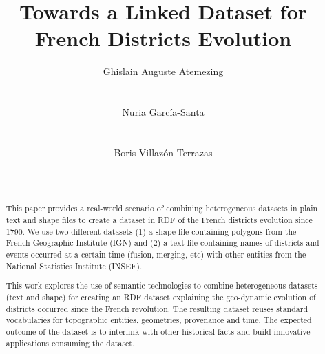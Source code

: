 \documentclass{sig-alternate}
\begin{document}


\title{Towards a Linked Dataset for French Districts Evolution}

\author{
\alignauthor Ghislain Auguste Atemezing\\
       \\
       \\
  \alignauthor Nuria Garc{\'i}a-Santa\\
       \\
       \\
\alignauthor Boris Villaz{\'o}n-Terrazas\\
       \\
       \\
}

\maketitle



\begin{abstract}
This paper provides a real-world scenario of combining heterogeneous datasets in plain text and shape files to create a dataset in RDF of the French districts evolution since 1790. We use two different datasets (1) a shape file containing polygons from the French Geographic Institute (IGN) and (2) a text file containing names of districts and events occurred at a certain time (fusion, merging, etc) with other entities from the National Statistics Institute (INSEE).  

This work explores the use of semantic technologies to combine heterogeneous datasets (text and shape) for creating an RDF dataset explaining the geo-dynamic evolution of districts occurred since the French revolution. The resulting dataset reuses standard vocabularies for topographic entities, geometries, provenance and time. The expected outcome of the dataset is to interlink with other historical facts and build innovative applications consuming the dataset.
\end{abstract}
\end{document}
